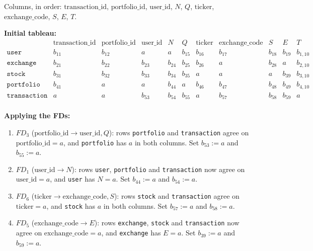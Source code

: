 \documentclass{article}
\newcommand{\at}[1]{\text{#1}}
\begin{document}
Columns, in order: $\at{transaction\_id}$, $\at{portfolio\_id}$, $\at{user\_id}$, $N$, $Q$, $\at{ticker}$, $\at{exchange\_code}$, $S$, $E$, $T$.

\textbf{Initial tableau:}
\[
\begin{array}{l|cccccccccc}
  & \at{transaction\_id} & \at{portfolio\_id} & \at{user\_id} & N & Q & \at{ticker} & \at{exchange\_code} & S & E & T \\
  \hline
  \texttt{user}        & b_{11} & b_{12} & a      & a      & b_{15} & b_{16} & b_{17} & b_{18} & b_{19} & b_{1,10} \\
  \texttt{exchange}    & b_{21} & b_{22} & b_{23} & b_{24} & b_{25} & b_{26} & a      & b_{28} & a      & b_{2,10} \\
  \texttt{stock}       & b_{31} & b_{32} & b_{33} & b_{34} & b_{35} & a      & a      & a      & b_{39} & b_{3,10} \\
  \texttt{portfolio}   & b_{41} & a      & a      & b_{44} & a      & b_{46} & b_{47} & b_{48} & b_{49} & b_{4,10} \\
  \texttt{transaction} & a      & a      & b_{53} & b_{54} & b_{55} & a      & b_{57} & b_{58} & b_{59} & a      \\
\end{array}
\]

\textbf{Applying the FDs:}
\begin{enumerate}[leftmargin=*]
  \item $FD_3$ ($\at{portfolio\_id} \rightarrow \at{user\_id}, Q$): rows \texttt{portfolio} and \texttt{transaction} agree on $\at{portfolio\_id} = a$, and \texttt{portfolio} has $a$ in both columns. Set $b_{53} := a$ and $b_{55} := a$.
  \item $FD_1$ ($\at{user\_id} \rightarrow N$): rows \texttt{user}, \texttt{portfolio} and \texttt{transaction} now agree on $\at{user\_id} = a$, and \texttt{user} has $N = a$. Set $b_{44} := a$ and $b_{54} := a$.
  \item $FD_6$ ($\at{ticker} \rightarrow \at{exchange\_code}, S$): rows \texttt{stock} and \texttt{transaction} agree on $\at{ticker} = a$, and \texttt{stock} has $a$ in both columns. Set $b_{57} := a$ and $b_{58} := a$.
  \item $FD_5$ ($\at{exchange\_code} \rightarrow E$): rows \texttt{exchange}, \texttt{stock} and \texttt{transaction} now agree on $\at{exchange\_code} = a$, and \texttt{exchange} has $E = a$. Set $b_{39} := a$ and $b_{59} := a$.
\end{enumerate}
\end{document}

